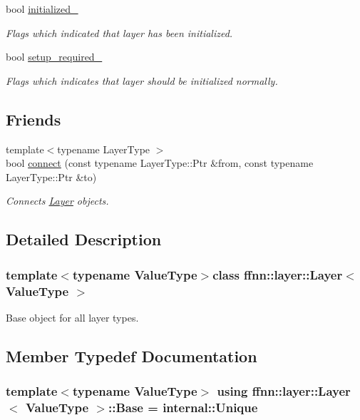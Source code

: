 \begin{DoxyCompactItemize}
bool \hyperlink{classffnn_1_1layer_1_1_layer_a4e353c2498ffed566076b3a7fd187e7b}{initialized\-\_\-}
\begin{DoxyCompactList}\small\item\em Flags which indicated that layer has been initialized. \end{DoxyCompactList}\item 
bool \hyperlink{classffnn_1_1layer_1_1_layer_a1a366d73e2b1ead280a6956c85ea56cb}{setup\-\_\-required\-\_\-}
\begin{DoxyCompactList}\small\item\em Flags which indicates that layer should be initialized normally. \end{DoxyCompactList}\end{DoxyCompactItemize}
\subsection*{Friends}
\begin{DoxyCompactItemize}
\item 
{\footnotesize template$<$typename Layer\-Type $>$ }\\bool \hyperlink{classffnn_1_1layer_1_1_layer_afbf91ff52dc8c3e894968dcc27cdecd5}{connect} (const typename Layer\-Type\-::\-Ptr \&from, const typename Layer\-Type\-::\-Ptr \&to)
\begin{DoxyCompactList}\small\item\em Connects \hyperlink{classffnn_1_1layer_1_1_layer}{Layer} objects. \end{DoxyCompactList}\end{DoxyCompactItemize}


\subsection{Detailed Description}
\subsubsection*{template$<$typename Value\-Type$>$class ffnn\-::layer\-::\-Layer$<$ Value\-Type $>$}

Base object for all layer types. 

\subsection{Member Typedef Documentation}
\hypertarget{classffnn_1_1layer_1_1_layer_a6c68e887931a3450aaba7a32cfe1f130}{
\subsubsection[{Base}]{\setlength{\rightskip}{0pt plus 5cm}template$<$typename Value\-Type$>$ using {\bf ffnn\-::layer\-::\-Layer}$<$ Value\-Type $>$\-::{\bf Base} =  {\bf internal\-::\-Unique}}}\label{classffnn_1_1layer_1_1_layer_a6c68e887931a3450aaba7a32cfe1f130}


